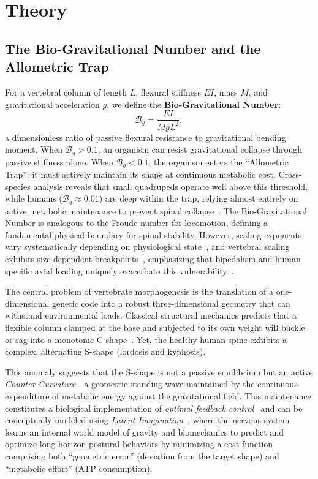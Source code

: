 \section{Theory}

\subsection{The Bio-Gravitational Number and the Allometric Trap}

For a vertebral column of length $L$, flexural stiffness $EI$, mass $M$, and gravitational acceleration $g$, we define the \textbf{Bio-Gravitational Number}:
\begin{equation}
\mathcal{B}_g = \frac{EI}{M g L^2},
\label{eq:bg_number_passive}
\end{equation}
a dimensionless ratio of passive flexural resistance to gravitational bending moment. When $\mathcal{B}_g > 0.1$, an organism can resist gravitational collapse through passive stiffness alone. When $\mathcal{B}_g < 0.1$, the organism enters the ``Allometric Trap'': it must actively maintain its shape at continuous metabolic cost. Cross-species analysis reveals that small quadrupeds operate well above this threshold, while humans ($\mathcal{B}_g \approx 0.01$) are deep within the trap, relying almost entirely on active metabolic maintenance to prevent spinal collapse~\cite{smit2020adolescent}. The Bio-Gravitational Number is analogous to the Froude number for locomotion, defining a fundamental physical boundary for spinal stability. However, scaling exponents vary systematically depending on physiological state~\cite{glazier2022variable}, and vertebral scaling exhibits size-dependent breakpoints~\cite{smith2024small}, emphasizing that bipedalism and human-specific axial loading uniquely exacerbate this vulnerability~\cite{gorman2009idiopathic}.

The central problem of vertebrate morphogenesis is the translation of a one-dimensional genetic code into a robust three-dimensional geometry that can withstand environmental loads. Classical structural mechanics predicts that a flexible column clamped at the base and subjected to its own weight will buckle or sag into a monotonic C-shape~\cite{goriely2017mathematics}. Yet, the healthy human spine exhibits a complex, alternating S-shape (lordosis and kyphosis).

This anomaly suggests that the S-shape is not a passive equilibrium but an active \emph{Counter-Curvature}---a geometric standing wave maintained by the continuous expenditure of metabolic energy against the gravitational field. This maintenance constitutes a biological implementation of \emph{optimal feedback control}~\cite{todorov2002optimal} and can be conceptually modeled using \emph{Latent Imagination}~\cite{hafner2019dreamer}, where the nervous system learns an internal world model of gravity and biomechanics to predict and optimize long-horizon postural behaviors by minimizing a cost function comprising both ``geometric error'' (deviation from the target shape) and ``metabolic effort'' (ATP consumption).

